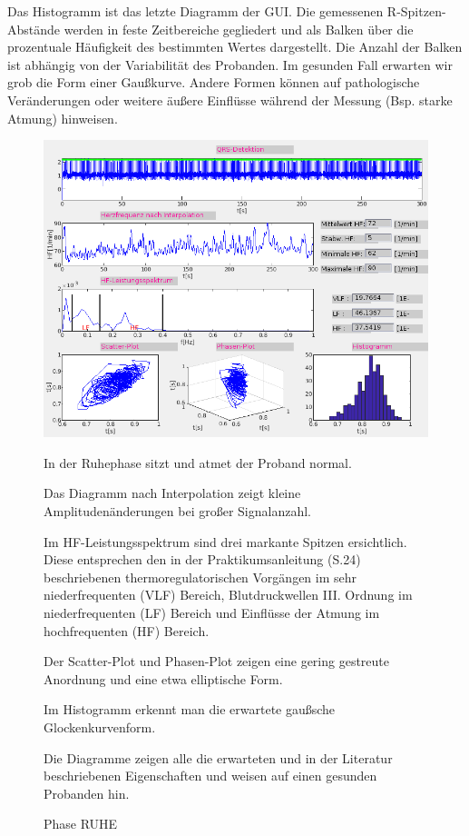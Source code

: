\documentclass[a4paper,12pt,titlepage]{scrartcl}
\begin{document}
Das Histogramm ist das letzte Diagramm der GUI. Die gemessenen R-Spitzen-Abstände werden in feste Zeitbereiche gegliedert und als Balken über die prozentuale Häufigkeit des bestimmten Wertes dargestellt. Die Anzahl der Balken ist abhängig von der Variabilität des Probanden. Im gesunden Fall erwarten wir grob die Form einer Gaußkurve. Andere Formen können auf pathologische Veränderungen oder weitere äußere Einflüsse während der Messung (Bsp. starke Atmung) hinweisen.

\begin{figure}[ht]
    \begin{minipage}[t]{0.5\linewidth}
        \centering
        \includegraphics[width=0.9\linewidth, valign=t]{Assets/LaborBMT-16-59-32.png}
        \caption{Phase RUHE}
        \label{phaseruhe}
    \end{minipage}%
    \begin{minipage}[t]{0.5\linewidth}
        In der Ruhephase sitzt und atmet der Proband normal.

        Das Diagramm nach Interpolation zeigt kleine Amplitudenänderungen bei großer Signalanzahl.

        Im HF-Leistungsspektrum sind drei markante Spitzen ersichtlich. Diese entsprechen den in der Praktikumsanleitung (S.24) beschriebenen thermoregulatorischen Vorgängen im sehr niederfrequenten (VLF) Bereich, Blutdruckwellen III. Ordnung im niederfrequenten (LF) Bereich und Einflüsse der Atmung im hochfrequenten (HF) Bereich.

        Der Scatter-Plot und Phasen-Plot zeigen eine gering gestreute Anordnung und eine etwa elliptische Form.

        Im Histogramm erkennt man die erwartete gaußsche Glockenkurvenform.

        Die Diagramme zeigen alle die erwarteten und in der Literatur beschriebenen Eigenschaften und weisen auf einen gesunden Probanden hin.

    \end{minipage}
\end{figure}
\end{document}
